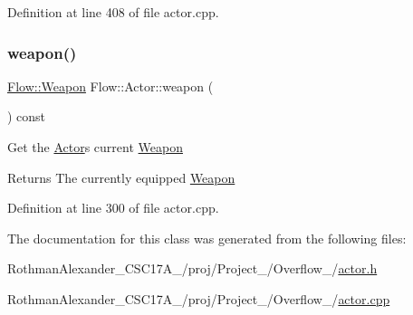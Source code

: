 Definition at line 408 of file actor.\+cpp.

\hypertarget{class_flow_1_1_actor_ad22b99397cfccf1b2e1f9022fd59a322}{}\label{class_flow_1_1_actor_ad22b99397cfccf1b2e1f9022fd59a322} 
\subsubsection{\texorpdfstring{weapon()}{weapon()}}
{\footnotesize\ttfamily \hyperlink{class_flow_1_1_weapon}{Flow\+::\+Weapon} Flow\+::\+Actor\+::weapon (\begin{DoxyParamCaption}{ }\end{DoxyParamCaption}) const}

Get the \hyperlink{class_flow_1_1_actor}{Actor}\textquotesingle{}s current \hyperlink{class_flow_1_1_weapon}{Weapon} \begin{DoxyReturn}{Returns}
The currently equipped \hyperlink{class_flow_1_1_weapon}{Weapon} 
\end{DoxyReturn}


Definition at line 300 of file actor.\+cpp.



The documentation for this class was generated from the following files\+:\begin{DoxyCompactItemize}
\item 
Rothman\+Alexander\+\_\+\+C\+S\+C17\+A\+\_/proj/\+Project\+\_/\+Overflow\+\_/\hyperlink{actor_8h}{actor.\+h}\item 
Rothman\+Alexander\+\_\+\+C\+S\+C17\+A\+\_/proj/\+Project\+\_/\+Overflow\+\_/\hyperlink{actor_8cpp}{actor.\+cpp}\end{DoxyCompactItemize}
